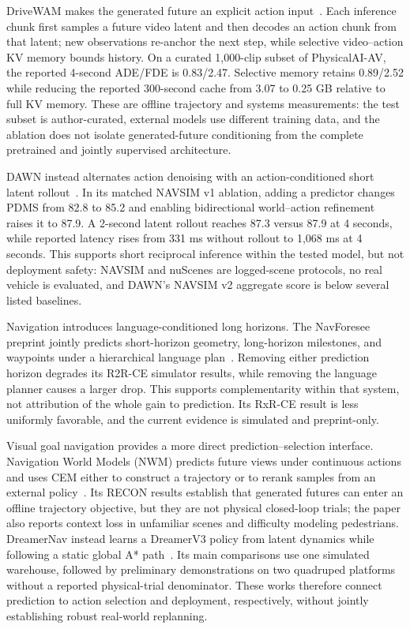 DriveWAM makes the generated future an explicit action input~\cite{shi2026drivewam}. Each inference chunk first samples a future video latent and then decodes an action chunk from that latent; new observations re-anchor the next step, while selective video--action KV memory bounds history. On a curated 1,000-clip subset of PhysicalAI-AV, the reported 4-second ADE/FDE is 0.83/2.47. Selective memory retains 0.89/2.52 while reducing the reported 300-second cache from 3.07 to 0.25 GB relative to full KV memory. These are offline trajectory and systems measurements: the test subset is author-curated, external models use different training data, and the ablation does not isolate generated-future conditioning from the complete pretrained and jointly supervised architecture.

DAWN instead alternates action denoising with an action-conditioned short latent rollout~\cite{lu2026dawn}. In its matched NAVSIM v1 ablation, adding a predictor changes PDMS from 82.8 to 85.2 and enabling bidirectional world--action refinement raises it to 87.9. A 2-second latent rollout reaches 87.3 versus 87.9 at 4 seconds, while reported latency rises from 331 ms without rollout to 1,068 ms at 4 seconds. This supports short reciprocal inference within the tested model, but not deployment safety: NAVSIM and nuScenes are logged-scene protocols, no real vehicle is evaluated, and DAWN's NAVSIM v2 aggregate score is below several listed baselines.

Navigation introduces language-conditioned long horizons. The NavForesee preprint jointly predicts short-horizon geometry, long-horizon milestones, and waypoints under a hierarchical language plan~\cite{liu2026navforesee}. Removing either prediction horizon degrades its R2R-CE simulator results, while removing the language planner causes a larger drop. This supports complementarity within that system, not attribution of the whole gain to prediction. Its RxR-CE result is less uniformly favorable, and the current evidence is simulated and preprint-only.

Visual goal navigation provides a more direct prediction--selection interface. Navigation World Models (NWM) predicts future views under continuous actions and uses CEM either to construct a trajectory or to rerank samples from an external policy~\cite{bar2025nwm}. Its RECON results establish that generated futures can enter an offline trajectory objective, but they are not physical closed-loop trials; the paper also reports context loss in unfamiliar scenes and difficulty modeling pedestrians. DreamerNav instead learns a DreamerV3 policy from latent dynamics while following a static global A* path~\cite{shanks2025dreamernav}. Its main comparisons use one simulated warehouse, followed by preliminary demonstrations on two quadruped platforms without a reported physical-trial denominator. These works therefore connect prediction to action selection and deployment, respectively, without jointly establishing robust real-world replanning.

